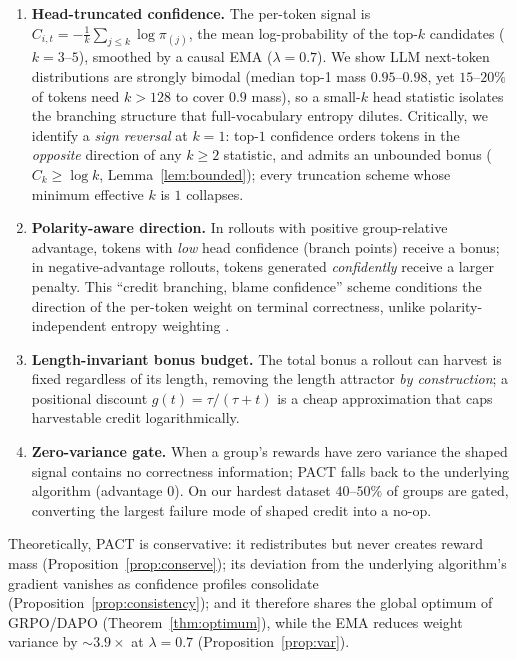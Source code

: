 \documentclass{article} %
\theoremstyle{plain}
\theoremstyle{definition}
\theoremstyle{remark}
\newcommand{\method}{PACT}
\begin{document}
\begin{enumerate}
    \item \textbf{Head-truncated confidence.} The per-token signal is $C_{i,t} = -\tfrac{1}{k}\sum_{j\le k}\log \pi_{(j)}$, the mean log-probability of the top-$k$ candidates ($k{=}3$--$5$), smoothed by a causal EMA ($\lambda{=}0.7$). We show LLM next-token distributions are strongly bimodal (median top-1 mass $0.95$--$0.98$, yet $15$--$20\%$ of tokens need $k{>}128$ to cover $0.9$ mass), so a small-$k$ head statistic isolates the branching structure that full-vocabulary entropy dilutes. Critically, we identify a \emph{sign reversal} at $k{=}1$: top-$1$ confidence orders tokens in the \emph{opposite} direction of any $k\ge 2$ statistic, and admits an unbounded bonus ($C_k \ge \log k$, Lemma~\ref{lem:bounded}); every truncation scheme whose minimum effective $k$ is $1$ collapses.
    \item \textbf{Polarity-aware direction.} In rollouts with positive group-relative advantage, tokens with \emph{low} head confidence (branch points) receive a bonus; in negative-advantage rollouts, tokens generated \emph{confidently} receive a larger penalty. This ``credit branching, blame confidence'' scheme conditions the direction of the per-token weight on terminal correctness, unlike polarity-independent entropy weighting \citep{tan2025gtpo}.
    \item \textbf{Length-invariant bonus budget.} The total bonus a rollout can harvest is fixed regardless of its length, removing the length attractor \emph{by construction}; a positional discount $g(t)=\tau/(\tau+t)$ is a cheap approximation that caps harvestable credit logarithmically.
    \item \textbf{Zero-variance gate.} When a group's rewards have zero variance the shaped signal contains no correctness information; \method{} falls back to the underlying algorithm (advantage $0$). On our hardest dataset $40$--$50\%$ of groups are gated, converting the largest failure mode of shaped credit into a no-op.
\end{enumerate}

Theoretically, \method{} is conservative: it redistributes but never creates reward mass (Proposition~\ref{prop:conserve}); its deviation from the underlying algorithm's gradient vanishes as confidence profiles consolidate (Proposition~\ref{prop:consistency}); and it therefore shares the global optimum of GRPO/DAPO (Theorem~\ref{thm:optimum}), while the EMA reduces weight variance by ${\sim}3.9\times$ at $\lambda=0.7$ (Proposition~\ref{prop:var}).
\end{document}
